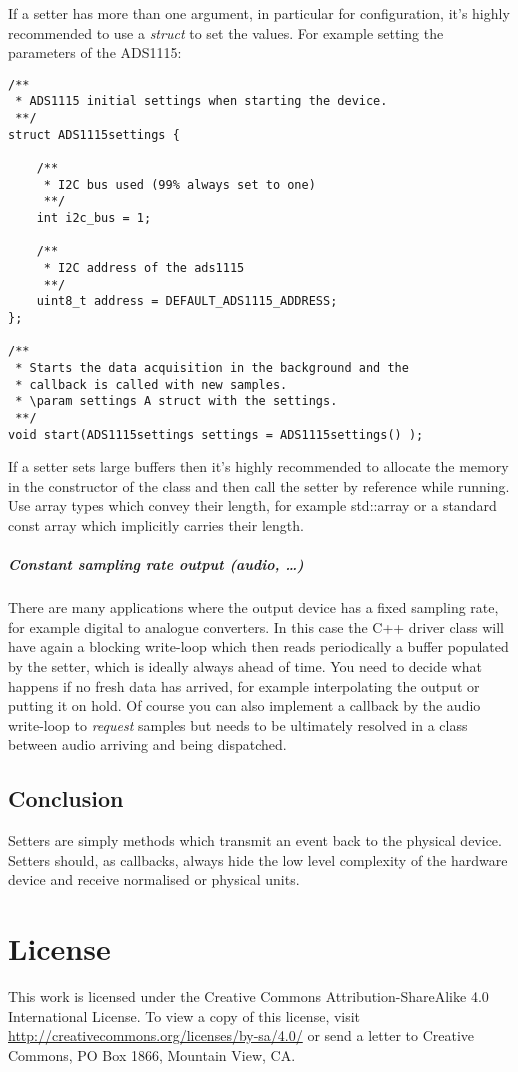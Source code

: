 \documentclass[12pt]{report}
\begin{document}
If a setter has more than one argument, in particular for
configuration, it's highly recommended to use a \textsl{struct} to set
the values. For example setting the parameters of the ADS1115:
\begin{verbatim}
/**
 * ADS1115 initial settings when starting the device.
 **/
struct ADS1115settings {

	/**
	 * I2C bus used (99% always set to one)
	 **/
	int i2c_bus = 1;

	/**
	 * I2C address of the ads1115
	 **/
	uint8_t address = DEFAULT_ADS1115_ADDRESS;
};

/**
 * Starts the data acquisition in the background and the
 * callback is called with new samples.
 * \param settings A struct with the settings.
 **/
void start(ADS1115settings settings = ADS1115settings() );
\end{verbatim}

If a setter sets large buffers then it's highly recommended
to allocate the memory in the constructor of the class and then call the setter by reference
while running. Use array types which convey their length, for example
std::array or a standard const array which implicitly carries their length.

\paragraph{Constant sampling rate output (audio, \ldots)}
There are many applications where the output device has a fixed
sampling rate, for example digital to analogue converters.  In this
case the C++ driver class will have again a blocking write-loop which
then reads periodically a buffer populated by the setter, which is
ideally always ahead of time. You need to decide what happens if no
fresh data has arrived, for example interpolating the output or
putting it on hold. Of course you can also implement a callback by the
audio write-loop to \textsl{request} samples but needs to be ultimately resolved
in a class between audio arriving and being dispatched.

\section{Conclusion}
Setters are simply methods which transmit an event back to the physical
device. Setters should, as callbacks, always hide the low level
complexity of the hardware device and receive normalised or physical
units.


\clearpage
\appendix
\chapter{License}
This work is licensed under the Creative Commons
Attribution-ShareAlike 4.0 International License. To view a copy of
this license, visit
\url{http://creativecommons.org/licenses/by-sa/4.0/} or
send a letter to Creative Commons, PO Box 1866, Mountain View, CA.
\end{document}
